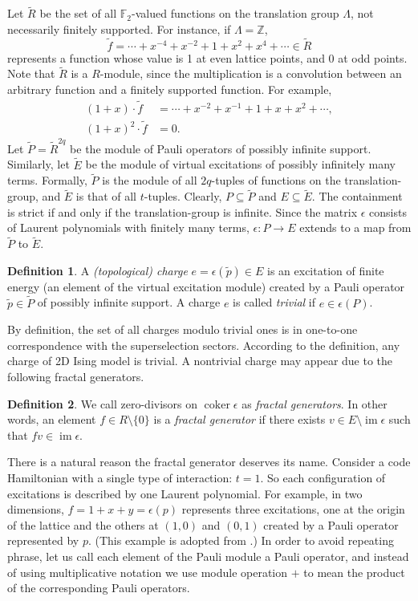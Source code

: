 \documentclass[letterpaper,12pt]{amsart}
\theoremstyle{definition} \newtheorem{defn}{Definition}
\theoremstyle{definition} \newtheorem{rem}{Remark}
\theoremstyle{definition} \newtheorem{example}{Example}
\newcommand{\im}{\mathop{\mathrm{im}}}
\newcommand{\coker}{\mathop{\mathrm{coker}}}
\newcommand{\FF}{\mathbb{F}}
\newcommand{\ZZ}{\mathbb{Z}}
\begin{document}
Let $\tilde R$ be the set of all $\FF_2$-valued functions on the translation group $\Lambda$,
not necessarily finitely supported. For instance, if $\Lambda = \ZZ$,
\[
\tilde f = \cdots + x^{-4} + x^{-2} + 1 + x^2 + x^4 + \cdots \in \tilde R
\]
represents a function whose value is 1 at even lattice points, and 0 at odd points.
Note that $\tilde R$ is a $R$-module,
since the multiplication is a convolution between an arbitrary function and a finitely supported function.
For example,
\begin{align*}
 (1+x) \cdot \tilde f &= \cdots + x^{-2} + x^{-1} + 1 + x + x^2 + \cdots , \\
 (1+x)^2 \cdot \tilde f &= 0 .
\end{align*}
Let $\tilde P = \tilde R^{2q}$ be the module of Pauli operators of possibly infinite support.
Similarly, let $\tilde E$ be the module of virtual excitations of possibly infinitely many terms.
Formally, $\tilde P$ is the module of all $2q$-tuples of functions on the translation-group,
and $\tilde E$ is that of all $t$-tuples.
Clearly, $P \subseteq \tilde P$ and $E \subseteq \tilde E$.
The containment is strict if and only if the translation-group is infinite.
Since the matrix $\epsilon$ consists of Laurent polynomials with finitely many terms,
$\epsilon:P \to E$ extends to a map from $\tilde P$ to $\tilde E$.
\begin{defn}
A \emph{(topological) charge} $e = \epsilon( \tilde p ) \in E$ 
is an excitation of finite energy (an element of the virtual excitation module)
created by a Pauli operator $\tilde p \in \tilde P$ of possibly infinite support.
A charge $e$ is called \emph{trivial} if $e \in \epsilon(P)$.
\end{defn}
\noindent By definition, the set of all charges modulo trivial ones is
in one-to-one correspondence with the superselection sectors.
According to the definition, any charge of 2D Ising model is trivial.
A nontrivial charge may appear due to the following fractal generators.
\begin{defn}
We call zero-divisors on $\coker \epsilon$ as \emph{fractal generators}.
In other words, %
an element $f \in R \setminus \{0\}$ is a {\em fractal generator} if
there exists $v \in E \setminus \im \epsilon$ 
such that $f v \in \im \epsilon$.
\end{defn}

There is a natural reason the fractal generator deserves its name.
Consider a code Hamiltonian with a single type of interaction: $t=1$.
So each configuration of excitations is described by one Laurent polynomial.
For example, in two dimensions, $f = 1 + x + y = \epsilon (p)$ represents
three excitations, one at the origin of the lattice and the others at $(1,0)$ and $(0,1)$
created by a Pauli operator represented by $p$.
(This example is adopted from \cite{NewmanMoore1999Glassy}.)
In order to avoid repeating phrase,
let us call each element of the Pauli module a Pauli operator,
and instead of using multiplicative notation
we use module operation $+$ to mean the product of the corresponding Pauli operators.
\end{document}
